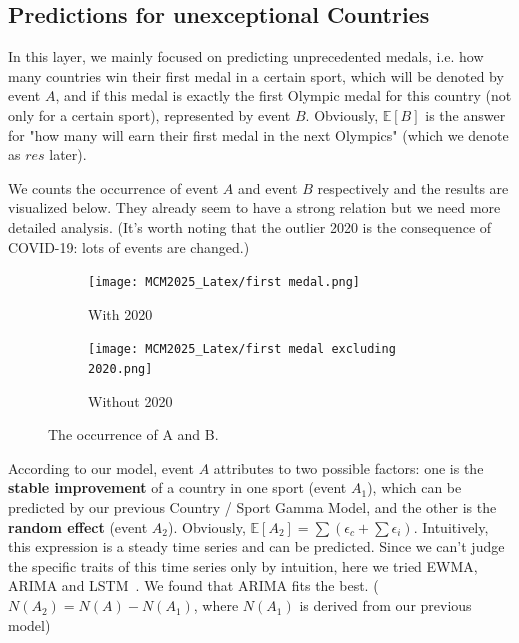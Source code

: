\documentclass{mcmthesis}
\begin{document}
\subsection{Predictions for unexceptional Countries}
In this layer, we mainly focused on predicting unprecedented medals, i.e. how many countries win their first medal in a certain sport, which will be denoted by event $A$, and if this medal is exactly the first Olympic medal for this country (not only for a certain sport), represented by event $B$. Obviously, $\mathbb{E}[B]$ is the answer for "how many will earn their first medal in the next Olympics" (which we denote as $res$ later).

We counts the occurrence of event $A$ and event $B$ respectively and the results are visualized below. They already seem to have a strong relation but we need more detailed analysis. (It's worth noting that the outlier 2020 is the consequence of COVID-19: lots of events are changed.)

\begin{figure}[htbp]
    \centering
    \hspace*{0.1\textwidth} %
    \begin{subfigure}[b]{0.35\textwidth} %
        \texttt{[image: MCM2025\_Latex/first medal.png]}
        \caption{With 2020}
        \label{fig:The occurrence of A and B}
    \end{subfigure}
    \hfill
    \begin{subfigure}[b]{0.35\textwidth} %
        \texttt{[image: MCM2025\_Latex/first medal excluding 2020.png]}
        \caption{Without 2020}
        \label{fig:The occurrence of A and B without 2020}
    \end{subfigure}
    \hspace*{0.1\textwidth} %
    \caption{The occurrence of A and B.}
\end{figure}


According to our model, event $A$ attributes to two possible factors: one is the \textbf{stable improvement} of a country in one sport (event $A_1$), which can be predicted by our previous Country / Sport Gamma Model, and the other is the \textbf{random effect} (event $A_2$). Obviously, $\mathbb{E}[A_2] = \sum (\epsilon_c + \sum \epsilon_i)$. Intuitively, this expression is a steady time series and can be predicted. Since we can't judge the specific traits of this time series only by intuition, here we tried EWMA, ARIMA and LSTM~\cite{7}. We found that ARIMA fits the best. ($N(A_2) = N(A) - N(A_1)$, where $N(A_1)$ is derived from our previous model)
\end{document}
